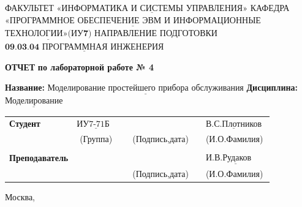 \documentclass[12pt,a4paper,oneside]{report}
\begin{document}
	\noindent ФАКУЛЬТЕТ $\underline{\textbf{«ИНФОРМАТИКА И СИСТЕМЫ УПРАВЛЕНИЯ»}}$ \newline\newline
	\noindent КАФЕДРА $\underline{\textbf{«ПРОГРАММНОЕ ОБЕСПЕЧЕНИЕ ЭВМ И ИНФОРМАЦИОННЫЕ}}$\newline\newline $\underline{\textbf{ТЕХНОЛОГИИ»(ИУ7)}}$\newline\newline
	\noindent НАПРАВЛЕНИЕ ПОДГОТОВКИ $\underline{\textbf{09.03.04 ПРОГРАММНАЯ ИНЖЕНЕРИЯ}}$\newline\newline\newline\newline\newline\newline\newline
	\begin{center}
		\begin{flushright}
			\Large\textbf{ОТЧЕТ}\newline
			\Large\textbf{по лабораторной работе № 4}\newline
		\end{flushright}
	\end{center}
	\noindent\textbf{Название:} $\underline{\text{Моделирование простейшего прибора обслуживания}}$\newline\newline
	\noindent\textbf{Дисциплина:} $\underline{\text{Моделирование}}$\newline\newline\newline\newline\newline\newline\newline\newline
	\begin{tabular}{lcp{5em}lp{2em}l}
		\noindent\textbf{Студент} &  $\underline{\text{ИУ7-71Б~~}}$ &             &\hspace{1cm} & & $\underline{\text{В.С.Плотников}}$ \\\cline{4-3}
		& (Группа) & &(Подпись,дата)  & & (И.О.Фамилия) \\
		& & & & &\\
		\noindent\textbf{Преподаватель} &  & &\hspace{1cm} & &$\underline{\text{И.В.Рудаков ~~~~}}$ \\\cline{4-3} 
		&  & & (Подпись,дата)  & &(И.О.Фамилия) \\
	\end{tabular}
	\begin{center}
		\vfill
		Москва, \the\year
	\end{center}
	\clearpage
\end{document}
